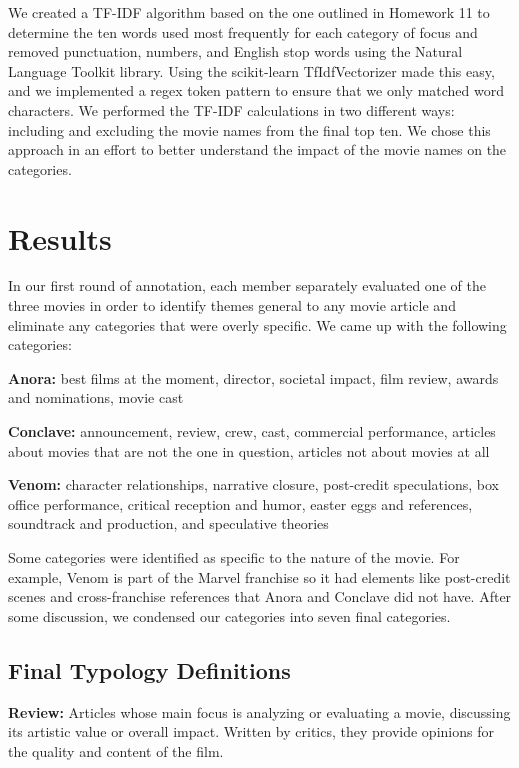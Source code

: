 \documentclass[letterpaper]{article} %
\begin{document}
We created a TF-IDF algorithm based on the one outlined in Homework 11 to determine the ten words used most frequently for each category of focus and removed punctuation, numbers, and English stop words using the Natural Language Toolkit library. Using the scikit-learn TfIdfVectorizer made this easy, and we implemented a regex token pattern to ensure that we only matched word characters. We performed the TF-IDF calculations in two different ways: including and excluding the movie names from the final top ten. We chose this approach in an effort to better understand the impact of the movie names on the categories.


\section{Results}
In our first round of annotation, each member separately evaluated one of the three movies in order to identify themes general to any movie article and eliminate any categories that were overly specific. We came up with the following categories:

\textbf{Anora:} best films at the moment, director, societal impact, film review, awards and nominations, movie cast

\textbf{Conclave:} announcement, review, crew, cast, commercial performance, articles about movies that are not the one in question, articles not about movies at all

\textbf{Venom:} character relationships, narrative closure, post-credit speculations, box office performance, critical reception and humor, easter eggs and references, soundtrack and production, and speculative theories

Some categories were identified as specific to the nature of the movie. For example, Venom is part of the Marvel franchise so it had elements like post-credit scenes and cross-franchise references that Anora and Conclave did not have. After some discussion, we condensed our categories into seven final categories.



\subsection{Final Typology Definitions}
\textbf{Review:} Articles whose main focus is analyzing or evaluating a movie, discussing its artistic value or overall impact. Written by critics, they provide opinions for the quality and content of the film. 
\end{document}
